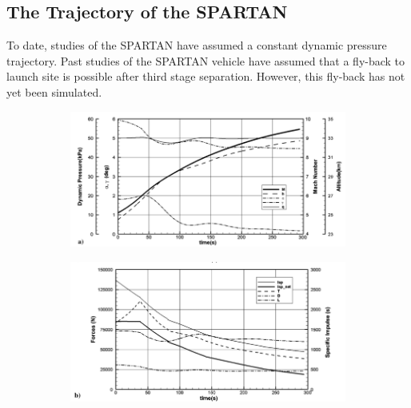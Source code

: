 \subsection{The Trajectory of the SPARTAN}

To date, studies of the SPARTAN have assumed a constant dynamic pressure trajectory\cite{Preller2017}.
Past studies of the SPARTAN vehicle have assumed that a fly-back to launch site is possible after third stage separation\cite{Preller2017}. However, this fly-back has not yet been simulated. 

	\begin{figure}[ht]
		\begin{subfigure}{.8\textwidth}
		\centering
		\includegraphics[width=0.99\linewidth]{figures/2_literature-review/SPARTAN_traj1}

		\label{fig:SPARTAN_traj1}
	\end{subfigure}
	\begin{subfigure}{.8\textwidth}
		\centering
		\includegraphics[width=0.99\linewidth]{figures/2_literature-review/SPARTAN_traj2}


\end{subfigure}
\end{figure}
